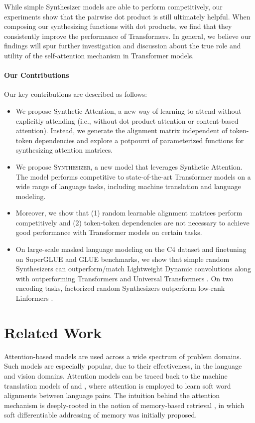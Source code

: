 While simple Synthesizer models are able to perform competitively, our experiments show that the pairwise dot product is still ultimately helpful. When composing our synthesizing functions with dot products, we find that they consistently improve the performance of Transformers. In general, we believe our findings will spur further investigation and discussion about the true role and utility of the self-attention mechanism in Transformer models.

\paragraph{Our Contributions} Our key contributions are described as follows:

\begin{itemize}
\item We propose Synthetic Attention, a new way of learning to attend without explicitly attending (i.e., without dot product attention or content-based attention). Instead, we generate the alignment matrix independent of token-token dependencies and explore a potpourri of parameterized functions for synthesizing attention matrices. 
\item We propose \textsc{Synthesizer}, a new model that leverages Synthetic Attention. The model performs competitive to state-of-the-art Transformer models on a wide range of language tasks, including machine translation and language modeling. 
\item Moreover, we show that (1) random learnable alignment matrices perform competitively and (2) token-token dependencies are not necessary to achieve good performance with Transformer models on certain tasks. 
\item On large-scale masked language modeling on the C4 dataset \citep{raffel2019exploring} and finetuning on SuperGLUE and GLUE benchmarks, we show that simple random Synthesizers can outperform/match Lightweight Dynamic convolutions \citep{wu2019pay} along with outperforming Transformers and Universal Transformers \citep{dehghani2018universal}. On two encoding tasks, factorized random Synthesizers outperform low-rank Linformers \citep{wang2020linformer}.
\end{itemize}

\section{Related Work} Attention-based models are used across a wide spectrum of problem domains. Such models are especially popular, due to their effectiveness, in the language and vision domains. Attention models can be traced back to the machine translation models of \citep{bahdanau2014neural} and \citep{luong2015effective}, where attention is employed to learn soft word alignments between language pairs. The intuition behind the attention mechanism is deeply-rooted in the notion of memory-based retrieval \citep{graves2014neural,weston2014memory}, in which soft differentiable addressing of memory was initially proposed. 

